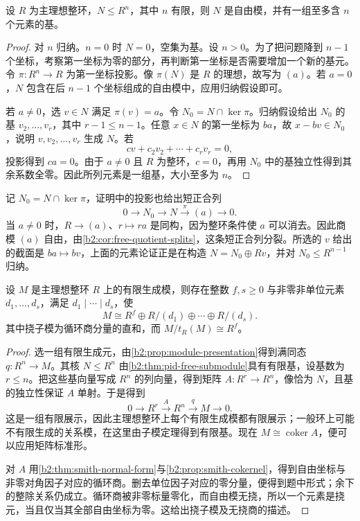 \begin{theorem}[主理想整环上的有限秩子模]\label{b2:thm:pid-free-submodule}
	设 \(R\) 为主理想整环，\(N\le R^n\)，其中 \(n\) 有限，则 \(N\) 是自由模，并有一组至多含 \(n\) 个元素的基。
\end{theorem}
\begin{proof}
	对 \(n\) 归纳。\(n=0\) 时 \(N=0\)，空集为基。设 \(n>0\)。为了把问题降到 \(n-1\) 个坐标，考察第一坐标为零的部分，再判断第一坐标是否需要增加一个新的基元。令 \(\pi:R^n\to R\) 为第一坐标投影。像 \(\pi(N)\) 是 \(R\) 的理想，故写为 \((a)\)。若 \(a=0\)，\(N\) 包含在后 \(n-1\) 个坐标组成的自由模中，应用归纳假设即可。

	若 \(a\ne0\)，选 \(v\in N\) 满足 \(\pi(v)=a\)。令 \(N_0=N\cap\ker\pi\)。归纳假设给出 \(N_0\) 的基 \(v_2,\ldots,v_r\)，其中 \(r-1\le n-1\)。任意 \(x\in N\) 的第一坐标为 \(ba\)，故 \(x-bv\in N_0\)，说明 \(v,v_2,\ldots,v_r\) 生成 \(N\)。若
	\[
		cv+c_2v_2+\cdots+c_rv_r=0,
	\]
	投影得到 \(ca=0\)。由于 \(a\ne0\) 且 \(R\) 为整环，\(c=0\)，再用 \(N_0\) 中的基独立性得到其余系数全零。因此所列元素是一组基，大小至多为 \(n\)。
\end{proof}

记 \(N_0=N\cap\ker\pi\)，证明中的投影也给出短正合列
\[
	0\longrightarrow N_0\longrightarrow N \xrightarrow{\pi}(a)\longrightarrow0.
\]
当 \(a\ne0\) 时，\(R\to(a)\)、\(r\mapsto ra\) 是同构，因为整环条件使 \(a\) 可以消去。因此商模 \((a)\) 自由，由\cref{b2:cor:free-quotient-splits}，这条短正合列分裂。所选的 \(v\) 给出的截面是 \(ba\mapsto bv\)，上面的元素论证正是在构造 \(N=N_0\oplus Rv\)，并对 \(N_0\le R^{n-1}\) 归纳。

\begin{theorem}[有限生成模的不变因子分解]\label{b2:thm:pid-module-structure}
	设 \(M\) 是主理想整环 \(R\) 上的有限生成模，则存在整数 \(f,s\ge0\) 与非零非单位元素 \(d_1,\ldots,d_s\)，满足 \(d_1\mid\cdots\mid d_s\)，使
	\[
		M\cong R^f\oplus R/(d_1)\oplus\cdots\oplus R/(d_s).
	\]
	其中挠子模为循环商分量的直和，而 \(M/t_R(M)\cong R^f\)。
\end{theorem}
\begin{proof}
	选一组有限生成元，由\cref{b2:prop:module-presentation}得到满同态 \(q:R^n\to M\)。其核 \(N\le R^n\) 由\cref{b2:thm:pid-free-submodule}具有有限基，设基数为 \(r\le n\)。把这些基向量写成 \(R^n\) 的列向量，得到矩阵 \(A:R^r\to R^n\)，像恰为 \(N\)，且基的独立性保证 \(A\) 单射。于是得到
	\[
		0\longrightarrow R^r\xrightarrow{A}R^n \xrightarrow{q}M\longrightarrow0.
	\]
	这是一组有限展示，因此主理想整环上每个有限生成模都有限展示；一般环上可能不有限生成的关系模，在这里由子模定理得到有限基。现在 \(M\cong\operatorname{coker}A\)，便可以应用矩阵标准形。

	对 \(A\) 用\cref{b2:thm:smith-normal-form}与\cref{b2:prop:smith-cokernel}，得到自由坐标与非零对角因子对应的循环商。删去单位因子对应的零分量，便得到题中形式；余下的整除关系仍成立。循环商被非零标量零化，而自由模无挠，所以一个元素是挠元，当且仅当其全部自由坐标为零。这给出挠子模及无挠商的描述。
\end{proof}

